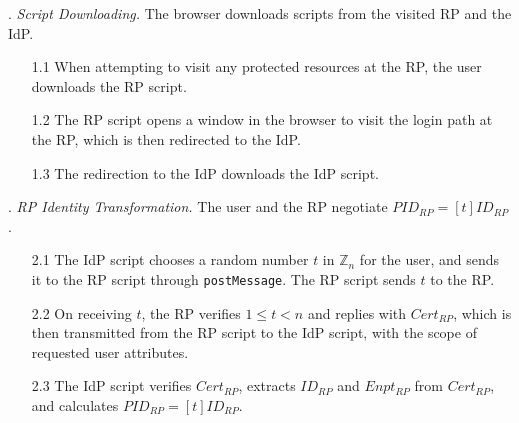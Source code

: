\vspace{0.5mm}
. {\em Script Downloading.}
The browser downloads scripts from the visited RP and the IdP.
\vspace{-\topsep}
\begin{itemize}
\setlength{\topsep}{0pt}
\setlength{\partopsep}{0pt}
\setlength{\itemsep}{0pt}
\setlength{\parsep}{0pt}
\setlength{\parskip}{0pt}
\item[1.1]
When attempting to visit any protected resources at the RP,
    the user downloads the RP script.
\item[1.2]
The RP script opens a window in the browser to visit the login path at the RP, which is then redirected to the IdP.
\item[1.3]
The redirection to the IdP downloads the IdP script.
\end{itemize}



. {\em RP Identity Transformation.}
The user and the RP negotiate $PID_{RP} = [t]{ID_{RP}}$.
\vspace{-\topsep}
\begin{itemize}
\setlength{\topsep}{0pt}
\setlength{\partopsep}{0pt}
\setlength{\itemsep}{0pt}
\setlength{\parsep}{0pt}
\setlength{\parskip}{0pt}
\item[2.1] The IdP script chooses a random number $t$ in $\mathbb{Z}_n$ for the user,
 and sends it to the RP script through \verb+postMessage+.
The RP script sends $t$ to the RP.
\item[2.2] On receiving $t$,
the RP verifies $1 \leq t < n$ and %
 replies with $Cert_{RP}$, which is then transmitted from the RP script to the IdP script,
    with the scope of requested user attributes.  %
\item[2.3] The IdP script verifies $Cert_{RP}$, extracts $ID_{RP}$ and $Enpt_{RP}$ from $Cert_{RP}$, and calculates $PID_{RP}=[t]{ID_{RP}}$.

\end{itemize}


